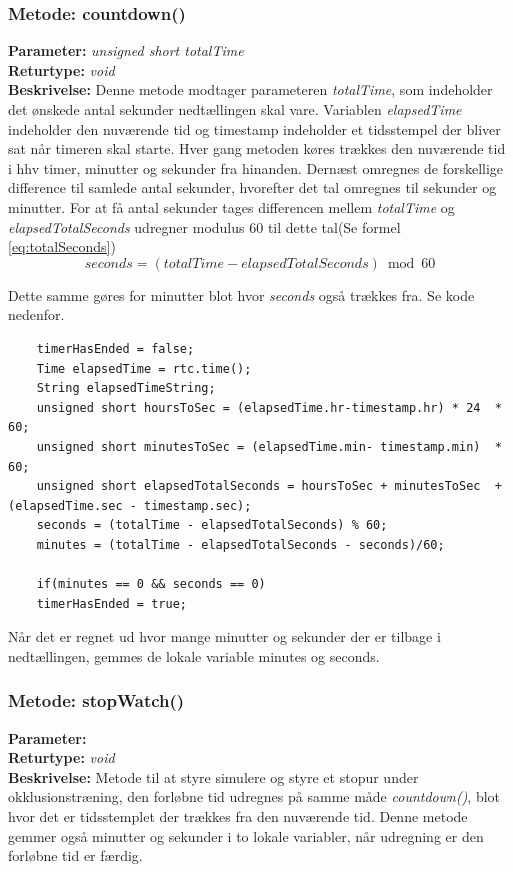 \subsubsection{Metode: countdown()}
\textbf{Parameter: } \textit{unsigned short totalTime}
\\ \textbf{Returtype: } \textit{void}
\\ \textbf{Beskrivelse: } Denne metode modtager parameteren \textit{totalTime}, som indeholder det ønskede antal sekunder nedtællingen skal vare. Variablen \textit{elapsedTime} indeholder den nuværende tid og timestamp indeholder et tidsstempel der bliver sat når timeren skal starte. Hver gang metoden køres trækkes den nuværende tid i hhv timer, minutter og sekunder fra hinanden. Dernæst omregnes de forskellige difference til samlede antal sekunder, hvorefter det tal omregnes til sekunder og minutter. For at få antal sekunder tages differencen mellem \textit{totalTime} og \textit{elapsedTotalSeconds} udregner modulus 60 til dette tal(Se formel \ref{eq:totalSeconds})
\begin{equation} \label{eq:totalSeconds}
seconds = (totalTime - elapsedTotalSeconds) \bmod 60
\end{equation}

Dette samme gøres for minutter blot hvor \textit{seconds} også trækkes fra. Se kode nedenfor. 
\begin{lstlisting}
	timerHasEnded = false;
	Time elapsedTime = rtc.time();
	String elapsedTimeString;
	unsigned short hoursToSec = (elapsedTime.hr-timestamp.hr) * 24	* 60;
	unsigned short minutesToSec = (elapsedTime.min- timestamp.min)	* 60;
	unsigned short elapsedTotalSeconds = hoursToSec + minutesToSec	+ (elapsedTime.sec - timestamp.sec);
	seconds = (totalTime - elapsedTotalSeconds) % 60;
	minutes = (totalTime - elapsedTotalSeconds - seconds)/60;
	
	if(minutes == 0 && seconds == 0)
	timerHasEnded = true;
\end{lstlisting}
Når det er regnet ud hvor mange minutter og sekunder der er tilbage i nedtællingen, gemmes de lokale variable minutes og seconds. 

\subsubsection{Metode: stopWatch()}
\textbf{Parameter: } 
\\ \textbf{Returtype: } \textit{void}
\\ \textbf{Beskrivelse: } Metode til at styre simulere og styre et stopur under okklusionstræning, den forløbne tid udregnes på samme måde \textit{countdown()}, blot hvor det er tidsstemplet der trækkes fra den nuværende tid. Denne metode gemmer også minutter og sekunder i to lokale variabler, når udregning er den forløbne tid er færdig. 

